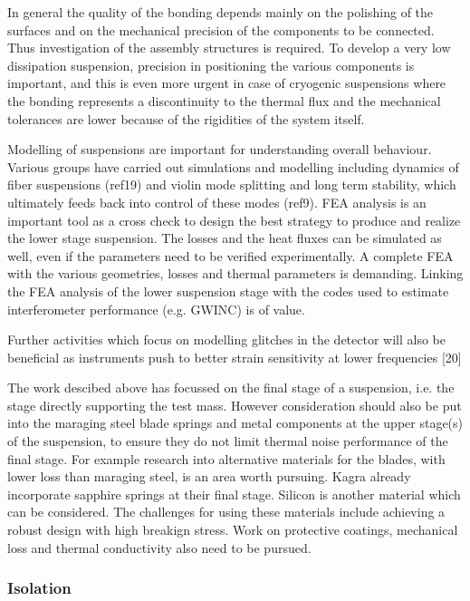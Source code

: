 In general the quality of the bonding depends mainly on the polishing of the surfaces and on the mechanical precision of the components to be connected. Thus investigation of the assembly structures is required. To develop a very low dissipation suspension, precision in positioning the various components is important, and this is even more urgent in case of cryogenic suspensions where the bonding represents a discontinuity to the thermal flux and the mechanical tolerances are lower because of the rigidities of the system itself.



Modelling of suspensions are important for understanding overall behaviour. Various groups have carried out simulations and modelling including dynamics of fiber suspensions (ref19) and violin mode splitting and long term stability, which ultimately feeds back into control of these modes (ref9). FEA analysis is an important tool as a cross check to design the best strategy to produce and realize the lower stage suspension. The losses and the heat fluxes can be simulated as well, even if the parameters need to be verified experimentally. A complete FEA with the various geometries, losses and thermal parameters is demanding. Linking the FEA analysis of the lower suspension stage with the codes used to estimate interferometer performance (e.g. GWINC) is of value.

Further activities which focus on modelling glitches in the detector will also be beneficial as instruments push to better strain sensitivity at lower frequencies [20]

The work descibed above has focussed on the final stage of a suspension, i.e. the stage directly supporting the test mass. However consideration should also be put into the maraging steel blade springs and metal components at the upper stage(s) of the suspension, to ensure they do not limit thermal noise performance of the final stage. For example research into alternative materials for the blades, with lower loss than maraging steel, is an area worth pursuing. Kagra already incorporate sapphire springs at their final stage. Silicon is another material which can be considered. The challenges for using these materials include achieving a robust design with high breakign stress. Work on protective coatings, mechanical loss and thermal conductivity also need to be pursued.

\subsubsection{Isolation}
